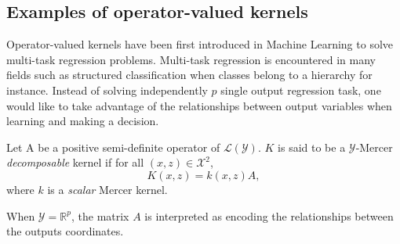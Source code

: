 \subsection{Examples of operator-valued kernels}
\label{subsec:ovk-ex}
Operator-valued kernels have been first introduced in Machine Learning to solve multi-task regression problems. Multi-task regression is encountered in many fields such as structured classification when classes belong to a hierarchy for instance. Instead of solving independently $p$ single output regression task, one would like to take advantage of the relationships between output variables when learning and making a decision.  
\begin{definition}
\label{dec-kernel}
Let A be a positive semi-definite operator of $\mathcal{L}(\mathcal{Y})$. $K$ is said to be a $\mathcal{Y}$-Mercer \emph{decomposable} kernel if for all $(x,z) \in \mathcal{X}^2$, 
\begin{dmath*}
K(x,z) = k(x,z)A, 
\end{dmath*}
where $k$ is a \emph{scalar} Mercer kernel.
\end{definition}
When $\mathcal{Y}=\mathbb{R}^p$, the matrix $A$ is interpreted as encoding the relationships between the outputs coordinates. 
